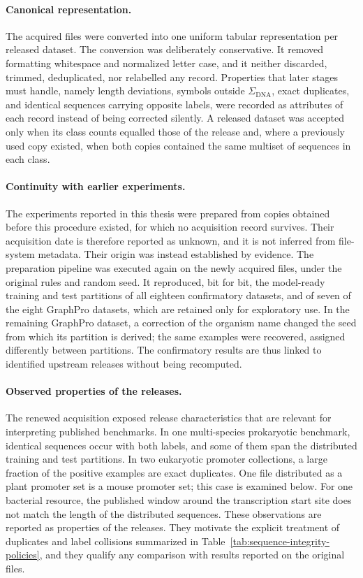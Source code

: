 \paragraph{Canonical representation.}
The acquired files were converted into one uniform tabular representation per
released dataset. The conversion was deliberately conservative. It removed
formatting whitespace and normalized letter case, and it neither discarded,
trimmed, deduplicated, nor relabelled any record. Properties that later stages
must handle, namely length deviations, symbols outside $\Sigma_{\mathrm{DNA}}$, exact
duplicates, and identical sequences carrying opposite labels, were recorded as
attributes of each record instead of being corrected silently. A released
dataset was accepted only when its class counts equalled those of the release
and, where a previously used copy existed, when both copies contained the same
multiset of sequences in each class.

\paragraph{Continuity with earlier experiments.}
The experiments reported in this thesis were prepared from copies obtained
before this procedure existed, for which no acquisition record survives. Their
acquisition date is therefore reported as unknown, and it is not inferred from
file-system metadata. Their origin was instead established by evidence. The
preparation pipeline was executed again on the newly acquired files, under the
original rules and random seed. It reproduced, bit for bit, the model-ready
training and test partitions of all eighteen confirmatory datasets, and of
seven of the eight GraphPro datasets, which are retained only for exploratory
use. In the remaining GraphPro dataset, a correction of the organism name
changed the seed from which its partition is derived; the same examples were
recovered, assigned differently between partitions. The confirmatory results
are thus linked to identified upstream releases without being recomputed.

\paragraph{Observed properties of the releases.}
The renewed acquisition exposed release characteristics that are relevant for
interpreting published benchmarks. In one multi-species prokaryotic benchmark,
identical sequences occur with both labels, and some of them span the
distributed training and test partitions. In two eukaryotic promoter
collections, a large fraction of the positive examples are exact duplicates.
One file distributed as a plant promoter set is a mouse promoter set; this case
is examined below. For one bacterial resource, the published window around the transcription
start site does not match the length of the distributed sequences. These
observations are reported as properties of the releases. They motivate the
explicit treatment of duplicates and label collisions summarized in
Table~\ref{tab:sequence-integrity-policies}, and they qualify any comparison with
results reported on the original files.

